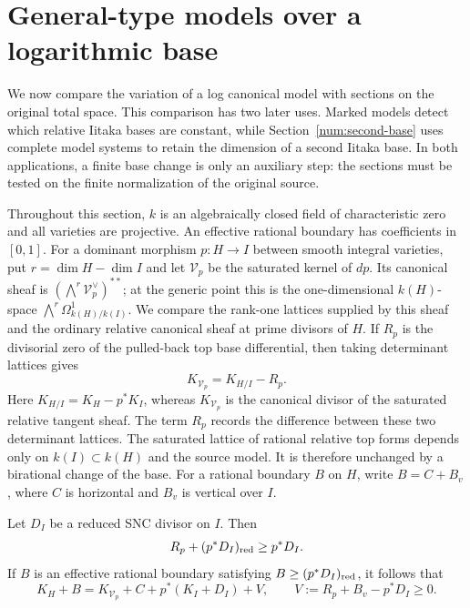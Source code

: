 \section{General-type models over a logarithmic base}\label{num:comparisons}

We now compare the variation of a log canonical model with sections on
the original total space. This comparison has two later uses. Marked
models detect which relative Iitaka bases are constant, while
Section~\ref{num:second-base} uses complete model systems to retain the
dimension of a second Iitaka base. In both applications, a finite base
change is only an auxiliary step: the sections must be tested on the
finite normalization of the original source.

Throughout this section, $k$ is an algebraically closed field of
characteristic zero and all varieties are projective. An effective
rational boundary has coefficients in $[0,1]$.
For a dominant morphism $p:H\to I$ between smooth integral varieties,
put $r=\dim H-\dim I$ and let $\mathcal V_p$ be the saturated kernel
of $dp$. Its canonical sheaf is
$(\bigwedge^r\mathcal V_p^\vee)^{**}$; at the generic point this is
the one-dimensional $k(H)$-space
$\bigwedge^r\Omega^1_{k(H)/k(I)}$. We compare the rank-one lattices
supplied by this sheaf and the ordinary relative canonical sheaf at
prime divisors of $H$. If $R_p$ is the divisorial zero of the pulled-back top
base differential, then taking determinant lattices gives
\begin{equation}\label{num:saturation}
 K_{\mathcal V_p}=K_{H/I}-R_p.
\end{equation}
Here $K_{H/I}=K_H-p^*K_I$, whereas $K_{\mathcal V_p}$ is the
canonical divisor of the saturated relative tangent sheaf. The term
$R_p$ records the difference between these two determinant lattices.
The saturated lattice of rational relative top forms depends only on
$k(I)\subset k(H)$ and the source model. It is therefore unchanged by
a birational change of the base. For a rational boundary $B$ on $H$,
write $B=C+B_v$, where $C$ is horizontal and $B_v$ is vertical over $I$.

\begin{lemma}\label{num:boundary}
Let $D_I$ be a reduced SNC divisor on $I$. Then
\[
 R_p+(p^*D_I)_{\mathrm{red}}\geq p^*D_I.
\]
If $B$ is an effective rational boundary satisfying
$B\geq(p^*D_I)_{\mathrm{red}}$, it follows that
\begin{equation}\label{num:decomposition}
 K_H+B=K_{\mathcal V_p}+C+p^*(K_I+D_I)+V,
 \qquad V:=R_p+B_v-p^*D_I\geq0.
\end{equation}
\end{lemma}

